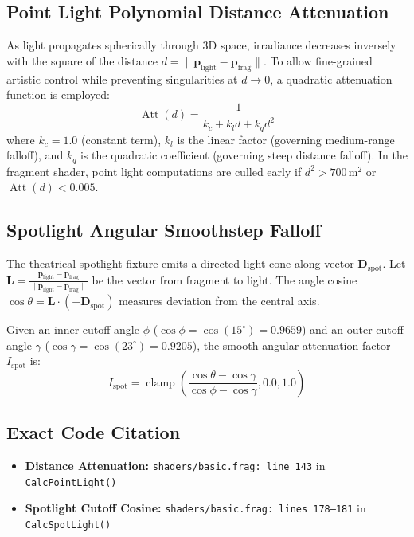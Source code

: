 \subsection{Point Light Polynomial Distance Attenuation}
As light propagates spherically through 3D space, irradiance decreases inversely with the square of the distance $d = \|\mathbf{p}_{\text{light}} - \mathbf{p}_{\text{frag}}\|$. To allow fine-grained artistic control while preventing singularities at $d \to 0$, a quadratic attenuation function is employed:
\begin{equation}
\operatorname{Att}(d) = \frac{1}{k_c + k_l d + k_q d^2}
\label{eq:attenuation}
\end{equation}
where $k_c = 1.0$ (constant term), $k_l$ is the linear factor (governing medium-range falloff), and $k_q$ is the quadratic coefficient (governing steep distance falloff). In the fragment shader, point light computations are culled early if $d^2 > 700\,\text{m}^2$ or $\operatorname{Att}(d) < 0.005$.

\subsection{Spotlight Angular Smoothstep Falloff}
The theatrical spotlight fixture emits a directed light cone along vector $\mathbf{D}_{\text{spot}}$. Let $\mathbf{L} = \frac{\mathbf{p}_{\text{light}} - \mathbf{p}_{\text{frag}}}{\|\mathbf{p}_{\text{light}} - \mathbf{p}_{\text{frag}}\|}$ be the vector from fragment to light. The angle cosine $\cos\theta = \mathbf{L} \cdot (-\mathbf{D}_{\text{spot}})$ measures deviation from the central axis.

Given an inner cutoff angle $\phi$ ($\cos\phi = \cos(15^\circ) = 0.9659$) and an outer cutoff angle $\gamma$ ($\cos\gamma = \cos(23^\circ) = 0.9205$), the smooth angular attenuation factor $I_{\text{spot}}$ is:
\begin{equation}
I_{\text{spot}} = \operatorname{clamp}\left( \frac{\cos\theta - \cos\gamma}{\cos\phi - \cos\gamma}, 0.0, 1.0 \right)
\label{eq:spotlight_cutoff}
\end{equation}

\subsection{Exact Code Citation}
\begin{itemize}
    \item \textbf{Distance Attenuation:} \texttt{shaders/basic.frag: line 143} in \texttt{CalcPointLight()}
    \item \textbf{Spotlight Cutoff Cosine:} \texttt{shaders/basic.frag: lines 178--181} in \texttt{CalcSpotLight()}
\end{itemize}

